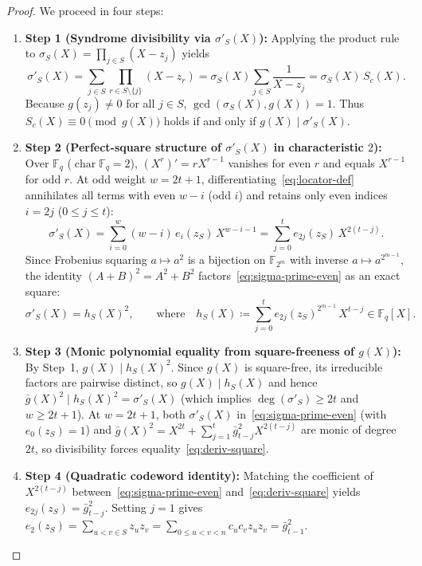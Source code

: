 \documentclass[11pt,a4paper]{article}
\theoremstyle{definition}
\theoremstyle{remark}
\newcommand{\F}{\mathbb{F}}
\begin{document}
\begin{proof}
We proceed in four steps:
\begin{enumerate}[leftmargin=2em]
    \item \textbf{Step 1 (Syndrome divisibility via $\sigma'_S(X)$):}
    Applying the product rule to $\sigma_S(X) = \prod_{j \in S}(X - z_j)$ yields
    \[
        \sigma'_S(X) = \sum_{j \in S} \prod_{r \in S \setminus \{j\}} (X - z_r)
        = \sigma_S(X) \sum_{j \in S} \frac{1}{X - z_j}
        = \sigma_S(X)\, S_c(X).
    \]
    Because $g(z_j) \neq 0$ for all $j \in S$, $\gcd(\sigma_S(X), g(X)) = 1$. Thus $S_c(X) \equiv 0 \pmod{g(X)}$ holds if and only if $g(X) \mid \sigma'_S(X)$.
    \item \textbf{Step 2 (Perfect-square structure of $\sigma'_S(X)$ in characteristic $2$):}
    Over $\F_q$ ($\operatorname{char}\F_q = 2$), $(X^r)' = r X^{r-1}$ vanishes for even $r$ and equals $X^{r-1}$ for odd $r$. At odd weight $w = 2t + 1$, differentiating~\eqref{eq:locator-def} annihilates all terms with even $w - i$ (odd $i$) and retains only even indices $i = 2j$ ($0 \le j \le t$):
    \begin{equation}
    \label{eq:sigma-prime-even}
        \sigma'_S(X) = \sum_{i=0}^w (w - i)\,e_i(z_S)\,X^{w - i - 1}
        = \sum_{j=0}^{t} e_{2j}(z_S)\,X^{2(t - j)}.
    \end{equation}
    Since Frobenius squaring $a \mapsto a^2$ is a bijection on $\F_{2^m}$ with inverse $a \mapsto a^{2^{m-1}}$, the identity $(A + B)^2 = A^2 + B^2$ factors~\eqref{eq:sigma-prime-even} as an exact square:
    \[
        \sigma'_S(X) = h_S(X)^2,
        \qquad\text{where}\quad
        h_S(X) \coloneqq \sum_{j=0}^t e_{2j}(z_S)^{2^{m-1}}\, X^{t - j} \in \F_q[X].
    \]
    \item \textbf{Step 3 (Monic polynomial equality from square-freeness of $g(X)$):}
    By Step~1, $g(X) \mid h_S(X)^2$. Since $g(X)$ is square-free, its irreducible factors are pairwise distinct, so $g(X) \mid h_S(X)$ and hence $\bar{g}(X)^2 \mid h_S(X)^2 = \sigma'_S(X)$ (which implies $\deg(\sigma'_S) \ge 2t$ and $w \ge 2t + 1$). At $w = 2t + 1$, both $\sigma'_S(X)$ in~\eqref{eq:sigma-prime-even} (with $e_0(z_S) = 1$) and $\bar{g}(X)^2 = X^{2t} + \sum_{j=1}^t \bar{g}_{t-j}^2 X^{2(t-j)}$ are monic of degree $2t$, so divisibility forces equality~\eqref{eq:deriv-square}.
    \item \textbf{Step 4 (Quadratic codeword identity):}
    Matching the coefficient of $X^{2(t-j)}$ between~\eqref{eq:sigma-prime-even} and~\eqref{eq:deriv-square} yields $e_{2j}(z_S) = \bar{g}_{t-j}^2$. Setting $j = 1$ gives $e_2(z_S) = \sum_{u < v \in S} z_u z_v = \sum_{0 \le u < v < n} c_u c_v z_u z_v = \bar{g}_{t-1}^2$.
\end{enumerate}
\end{proof}
\end{document}
